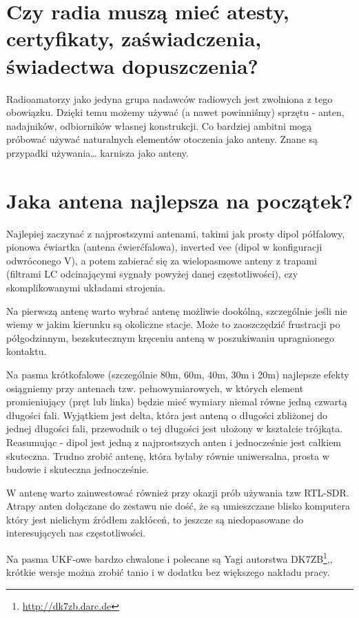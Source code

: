 \documentclass[a4paper,12pt]{article}
\begin{document}
\section{Czy radia muszą mieć atesty, certyfikaty, zaświadczenia, świadectwa dopuszczenia?}
Radioamatorzy jako jedyna grupa nadawców radiowych jest zwolniona z tego obowiązku. Dzięki temu możemy używać (a nawet powinniśmy) sprzętu - anten, nadajników, odbiorników własnej konstrukcji. Co bardziej ambitni mogą próbować używać naturalnych elementów otoczenia jako anteny. Znane są przypadki używania… karnisza jako anteny.

\section{Jaka antena najlepsza na początek?}
Najlepiej zaczynać z najprostszymi antenami, takimi jak prosty dipol półfalowy, pionowa ćwiartka (antena ćwierćfalowa), inverted vee (dipol w konfiguracji odwróconego V), a potem zabierać się za wielopasmowe anteny z trapami (filtrami LC odcinającymi sygnały powyżej danej częstotliwości), czy skomplikowanymi układami strojenia.

Na pierwszą antenę warto wybrać antenę możliwie dookólną, szczególnie jeśli nie wiemy w jakim kierunku są okoliczne stacje. Może to zaoszczędzić frustracji po półgodzinnym, bezskutecznym kręceniu anteną w poszukiwaniu upragnionego kontaktu.

Na pasma krótkofalowe (szczególnie 80m, 60m, 40m, 30m i 20m) najlepsze efekty osiągniemy przy antenach tzw. pełnowymiarowych, w których element promieniujący (pręt lub linka) będzie mieć wymiary niemal równe jedną czwartą długości fali. Wyjątkiem jest delta, która jest anteną o długości zbliżonej do jednej długości fali, przewodnik o tej długości jest ułożony w kształcie trójkąta. Reasumując - dipol jest jedną z najprostszych anten i jednocześnie jest całkiem skuteczna. Trudno zrobić antenę, która byłaby równie uniwersalna, prosta w budowie i skuteczna jednocześnie.

W antenę warto zainwestować również przy okazji prób używania tzw RTL-SDR. Atrapy anten dołączane do zestawu nie dość, że są umieszczane blisko komputera który jest nielichym źródłem zakłóceń, to jeszcze są niedopasowane do interesujących nas częstotliwości.

Na pasma UKF-owe bardzo chwalone i polecane są Yagi autorstwa DK7ZB\footnote{\url{http://dk7zb.darc.de}},, krótkie wersje można zrobić tanio i w dodatku bez większego nakładu pracy.
\end{document}
